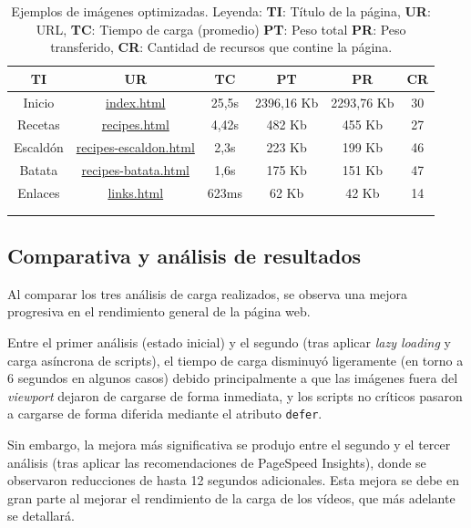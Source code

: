 \documentclass{article}
\begin{document}
\begin{longtable}{c|c|c|c|c|c}
    \hline
    \textbf{TI} & \textbf{UR} & \textbf{TC} & \textbf{PT} & \textbf{PR} & \textbf{CR} \\
    \endhead
    \hline
    Inicio & \href{https://www.danielramos.me/hhyc-dramosac/index.html}{index.html} & 25,5s & 2396,16 Kb & 2293,76 Kb & 30 \\
    Recetas & \href{https://www.danielramos.me/hhyc-dramosac/recipes.html}{recipes.html} & 4,42s & 482 Kb & 455 Kb & 27 \\
    Escaldón & \href{https://www.danielramos.me/hhyc-dramosac/recipes-escaldon.html}{recipes-escaldon.html} & 2,3s & 223 Kb & 199 Kb & 46 \\
    Batata & \href{https://www.danielramos.me/hhyc-dramosac/recipes-batata.html}{recipes-batata.html} & 1,6s & 175 Kb & 151 Kb & 47 \\
    Enlaces & \href{https://www.danielramos.me/hhyc-dramosac/links.html}{links.html} & 623ms & 62 Kb & 42 Kb & 14 \\
    \hline
     \\[1.5ex]
     \caption{
          Ejemplos de imágenes optimizadas.
          Leyenda: 
          \textbf{TI}: Título de la página, 
          \textbf{UR}: URL, 
          \textbf{TC}: Tiempo de carga (promedio) 
          \textbf{PT}: Peso total 
          \textbf{PR}: Peso transferido, 
          \textbf{CR}: Cantidad de recursos que contine la página.
     }
    \label{tab:pagespeed-insights}
\end{longtable}

\subsection{Comparativa y análisis de resultados}\label{sec:comparativa-y-analisis-de-resultados}

Al comparar los tres análisis de carga realizados, se observa una mejora progresiva en el rendimiento general de la página web.

Entre el primer análisis (estado inicial) y el segundo (tras aplicar \textit{lazy loading} y carga asíncrona de scripts), el tiempo de carga disminuyó ligeramente (en torno a 6 segundos en algunos casos) debido principalmente a que las imágenes fuera del \textit{viewport} dejaron de cargarse de forma inmediata, y los scripts no críticos pasaron a cargarse de forma diferida mediante el atributo \texttt{defer}.

Sin embargo, la mejora más significativa se produjo entre el segundo y el tercer análisis (tras aplicar las recomendaciones de PageSpeed Insights), donde se observaron reducciones de hasta 12 segundos adicionales. Esta mejora se debe en gran parte al mejorar el rendimiento de la carga de los vídeos, que más adelante se detallará.
\end{document}
